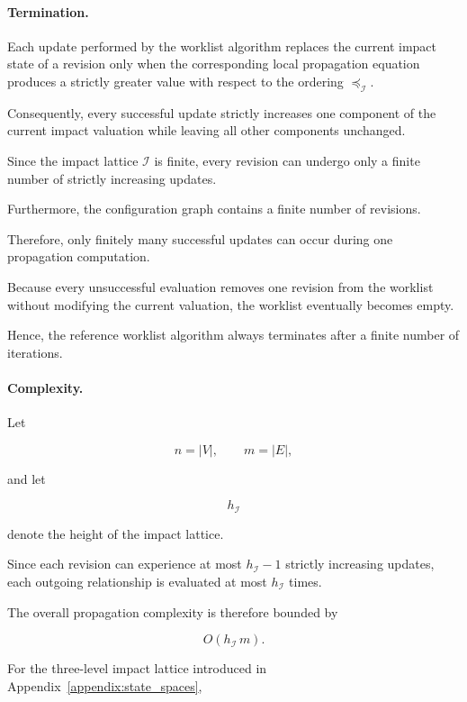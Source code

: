 \documentclass[10pt]{article}
\begin{document}
\paragraph{Termination.}

Each update performed by the worklist algorithm replaces the current impact
state of a revision only when the corresponding local propagation equation
produces a strictly greater value with respect to the ordering
$\preceq_{\mathcal I}$.

Consequently, every successful update strictly increases one component of the
current impact valuation while leaving all other components unchanged.

Since the impact lattice
$\mathcal I$
is finite, every revision can undergo only a finite number of strictly
increasing updates.

Furthermore, the configuration graph contains a finite number of revisions.

Therefore, only finitely many successful updates can occur during one
propagation computation.

Because every unsuccessful evaluation removes one revision from the worklist
without modifying the current valuation, the worklist eventually becomes empty.

Hence, the reference worklist algorithm always terminates after a finite number
of iterations.

\paragraph{Complexity.}

Let

\[
n
=
|V|,
\qquad
m
=
|E|,
\]

and let

\[
h_{\mathcal I}
\]

denote the height of the impact lattice.

Since each revision can experience at most
$h_{\mathcal I}-1$
strictly increasing updates, each outgoing relationship is evaluated at most
$h_{\mathcal I}$
times.

The overall propagation complexity is therefore bounded by

\begin{equation}
	\label{eq:worklist_complexity_final}
	O
	\!\left(
	h_{\mathcal I}
	\,m
	\right).
\end{equation}

For the three-level impact lattice introduced in
Appendix~\ref{appendix:state_spaces},
\end{document}
